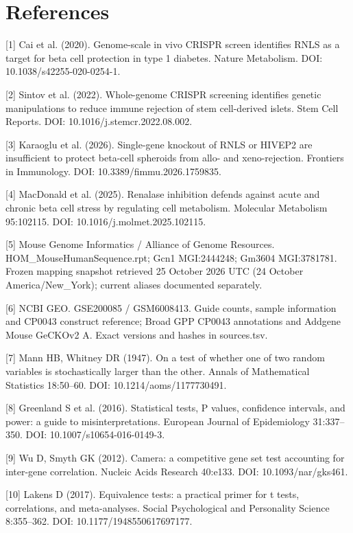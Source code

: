 \documentclass[11pt,letterpaper]{article}
\begin{document}
\section*{References}
{\small [1] Cai et al. (2020). Genome-scale in vivo CRISPR screen identifies RNLS as a target for beta cell protection in type 1 diabetes. Nature Metabolism. DOI: 10.1038/s42255-020-0254-1.\par}
{\small [2] Sintov et al. (2022). Whole-genome CRISPR screening identifies genetic manipulations to reduce immune rejection of stem cell-derived islets. Stem Cell Reports. DOI: 10.1016/j.stemcr.2022.08.002.\par}
{\small [3] Karaoglu et al. (2026). Single-gene knockout of RNLS or HIVEP2 are insufficient to protect beta-cell spheroids from allo- and xeno-rejection. Frontiers in Immunology. DOI: 10.3389/fimmu.2026.1759835.\par}
{\small [4] MacDonald et al. (2025). Renalase inhibition defends against acute and chronic beta cell stress by regulating cell metabolism. Molecular Metabolism 95:102115. DOI: 10.1016/j.molmet.2025.102115.\par}
{\small [5] Mouse Genome Informatics / Alliance of Genome Resources. HOM\_MouseHumanSequence.rpt; Gcn1 MGI:2444248; Gm3604 MGI:3781781. Frozen mapping snapshot retrieved 25 October 2026 UTC (24 October America/New\_York); current aliases documented separately.\par}
{\small [6] NCBI GEO. GSE200085 / GSM6008413. Guide counts, sample information and CP0043 construct reference; Broad GPP CP0043 annotations and Addgene Mouse GeCKOv2 A. Exact versions and hashes in sources.tsv.\par}
{\small [7] Mann HB, Whitney DR (1947). On a test of whether one of two random variables is stochastically larger than the other. Annals of Mathematical Statistics 18:50--60. DOI: 10.1214/aoms/1177730491.\par}
{\small [8] Greenland S et al. (2016). Statistical tests, P values, confidence intervals, and power: a guide to misinterpretations. European Journal of Epidemiology 31:337--350. DOI: 10.1007/s10654-016-0149-3.\par}
{\small [9] Wu D, Smyth GK (2012). Camera: a competitive gene set test accounting for inter-gene correlation. Nucleic Acids Research 40:e133. DOI: 10.1093/nar/gks461.\par}
{\small [10] Lakens D (2017). Equivalence tests: a practical primer for t tests, correlations, and meta-analyses. Social Psychological and Personality Science 8:355--362. DOI: 10.1177/1948550617697177.\par}
\end{document}
